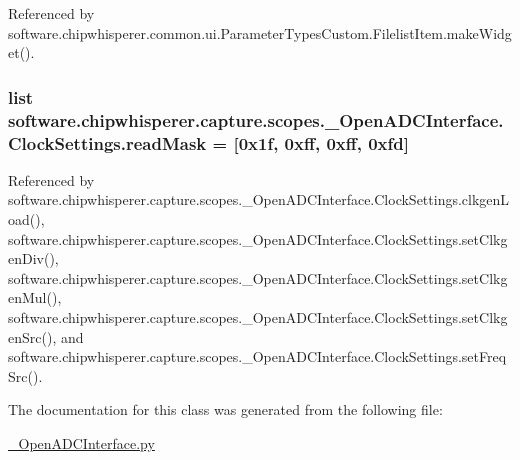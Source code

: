 Referenced by software.\+chipwhisperer.\+common.\+ui.\+Parameter\+Types\+Custom.\+Filelist\+Item.\+make\+Widget().

\hypertarget{classsoftware_1_1chipwhisperer_1_1capture_1_1scopes_1_1__OpenADCInterface_1_1ClockSettings_af900c99ec33571fd03e3d151b3b748c6}{}
\subsubsection[{read\+Mask}]{\setlength{\rightskip}{0pt plus 5cm}list software.\+chipwhisperer.\+capture.\+scopes.\+\_\+\+Open\+A\+D\+C\+Interface.\+Clock\+Settings.\+read\+Mask = \mbox{[}0x1f, 0xff, 0xff, 0xfd\mbox{]}\hspace{0.3cm}{\ttfamily [static]}}\label{classsoftware_1_1chipwhisperer_1_1capture_1_1scopes_1_1__OpenADCInterface_1_1ClockSettings_af900c99ec33571fd03e3d151b3b748c6}


Referenced by software.\+chipwhisperer.\+capture.\+scopes.\+\_\+\+Open\+A\+D\+C\+Interface.\+Clock\+Settings.\+clkgen\+Load(), software.\+chipwhisperer.\+capture.\+scopes.\+\_\+\+Open\+A\+D\+C\+Interface.\+Clock\+Settings.\+set\+Clkgen\+Div(), software.\+chipwhisperer.\+capture.\+scopes.\+\_\+\+Open\+A\+D\+C\+Interface.\+Clock\+Settings.\+set\+Clkgen\+Mul(), software.\+chipwhisperer.\+capture.\+scopes.\+\_\+\+Open\+A\+D\+C\+Interface.\+Clock\+Settings.\+set\+Clkgen\+Src(), and software.\+chipwhisperer.\+capture.\+scopes.\+\_\+\+Open\+A\+D\+C\+Interface.\+Clock\+Settings.\+set\+Freq\+Src().



The documentation for this class was generated from the following file\+:\begin{DoxyCompactItemize}
\item 
\hyperlink{__OpenADCInterface_8py}{\+\_\+\+Open\+A\+D\+C\+Interface.\+py}\end{DoxyCompactItemize}
